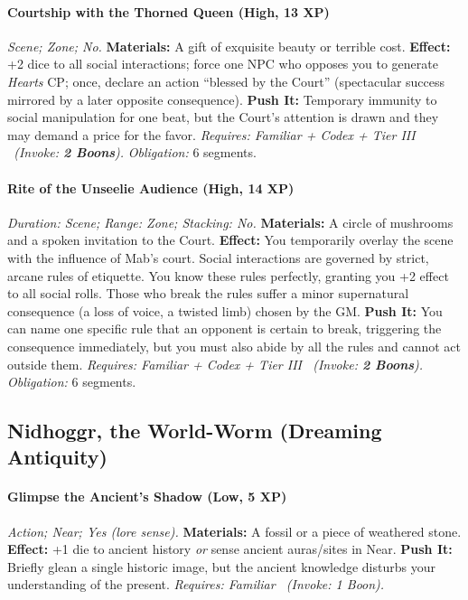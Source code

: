 \documentclass[12pt,twoside]{book}
\begin{document}
\paragraph{Courtship with the Thorned Queen (High, 13 XP)} \emph{Scene; Zone; No.}
\textbf{Materials:} A gift of exquisite beauty or terrible cost.
\textbf{Effect:} +2 dice to all social interactions; force one NPC who opposes you to generate \emph{Hearts} CP; once, declare an action ``blessed by the Court'' (spectacular success mirrored by a later opposite consequence).
\textbf{Push It:} Temporary immunity to social manipulation for one beat, but the Court's attention is drawn and they may demand a price for the favor.
\emph{Requires: Familiar + Codex + Tier III \ (\textit{Invoke:} \textbf{2 Boons}).}
\emph{Obligation:} 6 segments.

\paragraph{Rite of the Unseelie Audience (High, 14 XP)} \emph{Duration: Scene; Range: Zone; Stacking: No.}
\textbf{Materials:} A circle of mushrooms and a spoken invitation to the Court.
\textbf{Effect:} You temporarily overlay the scene with the influence of Mab's court. Social interactions are governed by strict, arcane rules of etiquette. You know these rules perfectly, granting you +2 effect to all social rolls. Those who break the rules suffer a minor supernatural consequence (a loss of voice, a twisted limb) chosen by the GM.
\textbf{Push It:} You can name one specific rule that an opponent is certain to break, triggering the consequence immediately, but you must also abide by all the rules and cannot act outside them.
\emph{Requires: Familiar + Codex + Tier III \ (\textit{Invoke:} \textbf{2 Boons}).}
\emph{Obligation:} 6 segments.

\subsection{Nidhoggr, the World-Worm (Dreaming Antiquity)}
\paragraph{Glimpse the Ancient's Shadow (Low, 5 XP)} \emph{Action; Near; Yes (lore sense).}
\textbf{Materials:} A fossil or a piece of weathered stone.
\textbf{Effect:} +1 die to ancient history \emph{or} sense ancient auras/sites in Near.
\textbf{Push It:} Briefly glean a single historic image, but the ancient knowledge disturbs your understanding of the present.
\emph{Requires: Familiar \ (\textit{Invoke:} 1 Boon).}
\end{document}
